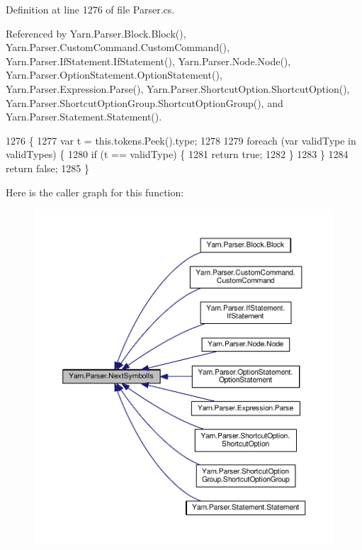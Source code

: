 Definition at line 1276 of file Parser.\-cs.



Referenced by Yarn.\-Parser.\-Block.\-Block(), Yarn.\-Parser.\-Custom\-Command.\-Custom\-Command(), Yarn.\-Parser.\-If\-Statement.\-If\-Statement(), Yarn.\-Parser.\-Node.\-Node(), Yarn.\-Parser.\-Option\-Statement.\-Option\-Statement(), Yarn.\-Parser.\-Expression.\-Parse(), Yarn.\-Parser.\-Shortcut\-Option.\-Shortcut\-Option(), Yarn.\-Parser.\-Shortcut\-Option\-Group.\-Shortcut\-Option\-Group(), and Yarn.\-Parser.\-Statement.\-Statement().


\begin{DoxyCode}
1276                                                          \{
1277             var t = this.tokens.Peek().type;
1278 
1279             \textcolor{keywordflow}{foreach} (var validType \textcolor{keywordflow}{in} validTypes) \{
1280                 \textcolor{keywordflow}{if} (t == validType) \{
1281                     \textcolor{keywordflow}{return} \textcolor{keyword}{true};
1282                 \}
1283             \}
1284             \textcolor{keywordflow}{return} \textcolor{keyword}{false};
1285         \}
\end{DoxyCode}


Here is the caller graph for this function\-:
\nopagebreak
\begin{figure}[H]
\begin{center}
\leavevmode
\includegraphics[width=350pt]{a00139_a666a945da1a7845b02b92592fccac291_icgraph}
\end{center}
\end{figure}



